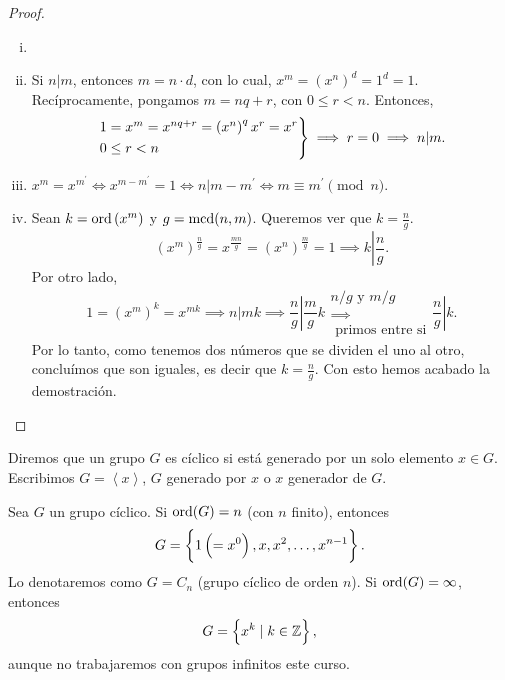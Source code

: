 \begin{proof}
    \begin{enumerate}[i)]
        \item[]
        \item Si $n \vert m$, entonces $m = n \cdot d$, con lo cual, $x^m = \left( x^n \right)^d = 1^d = 1$. Recíprocamente, pongamos $m = nq + r$, con $0 \leq r < n$. Entonces,
            \[
                \begin{rcases}
                    1 = x^m = x^{nq + r} = \left( x^n \right)^q x^r = x^r \\
                    0 \leq r < n
                \end{rcases}
                \implies r = 0 \implies n \vert m.
            \]
        \item $x^m = x^{m^\prime} \iff x^{m - m^\prime} = 1 \iff n \vert m - m^\prime \iff
            m \equiv m^\prime \pmod{n}$.
        \item Sean $k = \operatorname{ord}\left( x^m \right)$ y $g = \operatorname{mcd}(n, m)$. Queremos ver que $k = \frac{n}{g}$.
            \[
                \left( x^m \right)^{\frac{n}{g}} = x^{\frac{mn}{g}} = \left( x^n \right)^{\frac{m}{g}} = 1
                \implies k \left\vert \frac{n}{g} \right. .
            \]
            Por otro lado,
            \[
                1 = \left( x^m \right)^k = x^{mk} \implies n \vert mk \implies \left.\frac{n}{g} \right\vert \frac{m}{g} k
                \substack{n/g \text{ y } m/g \\ \implies \\ \text{ primos entre si}} \left.\frac{n}{g} \right\vert k.
            \]
            Por lo tanto, como tenemos dos números que se dividen el uno al otro, concluímos que son iguales, es decir que $k = \frac{n}{g}$. Con esto hemos acabado la demostración.
    \end{enumerate}
\end{proof}

\begin{defi}
    Diremos que un grupo $G$ es cíclico si está generado por un solo elemento $x \in G$. Escribimos $G = \left< x \right>$, $G$
    generado por $x$ o $x$ generador de $G$.
\end{defi}

\begin{obs}
    Sea $G$ un grupo cíclico. Si $\operatorname{ord}(G) = n$ (con $n$ finito), entonces
    \[
        G = \left\{ 1 \left( = x^0 \right), x, x^2, \dots, x^{n-1}\right\}.
    \]
    Lo denotaremos como $G = C_n$ (grupo cíclico de orden $n$).
    Si $\operatorname{ord}(G) = \infty$, entonces
    \[
        G = \left\{x^k \mid k \in \mathbb{Z}\right\},
    \]
    aunque no trabajaremos con grupos infinitos este curso.
\end{obs}

